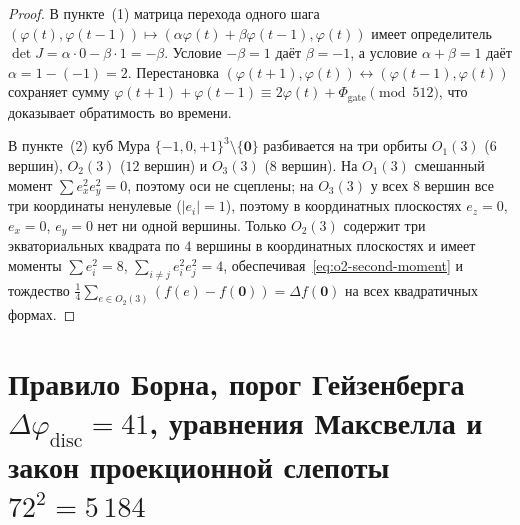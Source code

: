 \documentclass[11pt,a4paper]{article}
\theoremstyle{plain}
\theoremstyle{definition}
\begin{document}
\begin{proof}
В пункте~(1) матрица перехода одного шага $(\varphi(t), \varphi(t-1)) \mapsto (\alpha\varphi(t) + \beta\varphi(t-1), \varphi(t))$ имеет определитель $\det J = \alpha\cdot 0 - \beta\cdot 1 = -\beta$. Условие $-\beta = 1$ даёт $\beta = -1$, а условие $\alpha + \beta = 1$ даёт $\alpha = 1 - (-1) = 2$. Перестановка $(\varphi(t+1), \varphi(t)) \leftrightarrow (\varphi(t-1), \varphi(t))$ сохраняет сумму $\varphi(t+1) + \varphi(t-1) \equiv 2\varphi(t) + \Phi_{\mathrm{gate}} \pmod{512}$, что доказывает обратимость во времени.

В пункте~(2) куб Мура $\{-1,0,+1\}^3 \setminus \{\mathbf{0}\}$ разбивается на три орбиты $O_1(3)$ ($6$ вершин), $O_2(3)$ ($12$ вершин) и $O_3(3)$ ($8$ вершин). На $O_1(3)$ смешанный момент $\sum e_x^2 e_y^2 = 0$, поэтому оси не сцеплены; на $O_3(3)$ у всех $8$ вершин все три координаты ненулевые ($|e_i| = 1$), поэтому в координатных плоскостях $e_z = 0$, $e_x = 0$, $e_y = 0$ нет ни одной вершины. Только $O_2(3)$ содержит три экваториальных квадрата по $4$ вершины в координатных плоскостях и имеет моменты $\sum e_i^2 = 8$, $\sum_{i\ne j} e_i^2 e_j^2 = 4$, обеспечивая~\eqref{eq:o2-second-moment} и тождество $\frac{1}{4}\sum_{e\in O_2(3)}(f(e) - f(\mathbf{0})) = \Delta f(\mathbf{0})$ на всех квадратичных формах.
\end{proof}

\section{Правило Борна, порог Гейзенберга \texorpdfstring{$\Delta\varphi_{\mathrm{disc}}=41$}{dphi=41}, уравнения Максвелла и закон проекционной слепоты \texorpdfstring{$72^2=5\,184$}{72^2=5184}}
\label{sec:born-maxwell-heisenberg}
\end{document}
